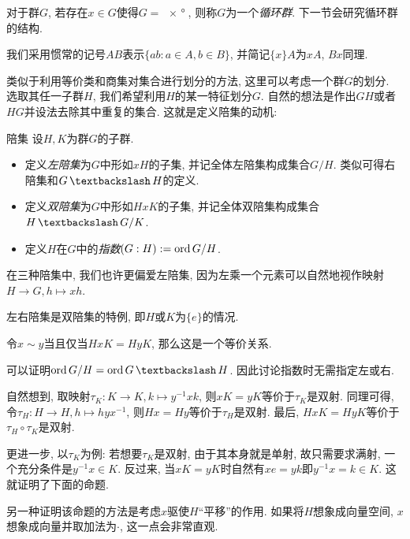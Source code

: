\begin{example}
	对于群$G$, 若存在$x \in G$使得$G=\ang{x}$, 则称$G$为一个\textit{循环群}. 下一节会研究循环群的结构. 
\end{example}

我们采用惯常的记号$AB$表示$\{ ab:a \in A,b \in B \}$, 并简记$\{ x \}A$为$xA$, $Bx$同理. 

类似于利用等价类和商集对集合进行划分的方法, 这里可以考虑一个群$G$的划分. 选取其任一子群$H$, 我们希望利用$H$的某一特征划分$G$. 自然的想法是作出$GH$或者$HG$并设法去除其中重复的集合. 这就是定义陪集的动机: 

\begin{definition}{陪集}
	设$H,K$为群$G$的子群. 
	\begin{itemize}
		\item 定义\textit{左陪集}为$G$中形如$xH$的子集, 并记全体左陪集构成集合$G/H$. 类似可得右陪集和$G\setjianfa H$的定义. 
		\item 定义\textit{双陪集}为$G$中形如$HxK$的子集, 并记全体双陪集构成集合$H\setjianfa G /K$. 
		\item 定义$H$在$G$中的\textit{指数}$(G:H):=\operatorname{ord} G/H$. 
	\end{itemize}
\end{definition}
\begin{remark}
	在三种陪集中, 我们也许更偏爱左陪集, 因为左乘一个元素可以自然地视作映射$H \to G, h \mapsto xh$. 
\end{remark}
\begin{remark}
	左右陪集是双陪集的特例, 即$H$或$K$为$\{ e \}$的情况. 
\end{remark}
\begin{remark}
	令$x \sim y$当且仅当$HxK=HyK$, 那么这是一个等价关系. 
\end{remark}
\begin{remark}
	可以证明$\ord G/H = \ord G \setjianfa H$. 因此讨论指数时无需指定左或右. 
\end{remark}

自然想到, 取映射$\tau _K :K \to K, k \mapsto y^{-1}xk$, 则$xK=yK$等价于$\tau _K$是双射. 同理可得, 令$\tau _H:H \to H, h \mapsto hyx^{-1}$, 则$Hx=Hy$等价于$\tau _H$是双射. 最后, $HxK=HyK$等价于$\tau _H \circ \tau _K$是双射. 

更进一步, 以$\tau _K$为例: 若想要$\tau _K$是双射, 由于其本身就是单射, 故只需要求满射, 一个充分条件是$y^{-1}x \in K$. 反过来, 当$xK=yK$时自然有$xe=yk$即$y^{-1}x=k \in K$. 这就证明了下面的命题. 

另一种证明该命题的方法是考虑$x$驱使$H$“平移”的作用. 如果将$H$想象成向量空间, $x$想象成向量并取加法为$\cdot$, 这一点会非常直观. 

